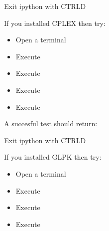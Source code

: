 \documentclass[letterpaper,10pt,english]{sphinxmanual}
\begin{document}
\sphinxAtStartPar
Exit ipython with CTRL\sphinxhyphen{}D

\sphinxAtStartPar
If you installed CPLEX then try:
\begin{itemize}
\item {} 
\sphinxAtStartPar
Open a terminal

\item {} 
\sphinxAtStartPar
Execute 

\item {} 
\sphinxAtStartPar
Execute 

\item {} 
\sphinxAtStartPar
Execute 

\item {} 
\sphinxAtStartPar
Execute 

\end{itemize}

\sphinxAtStartPar
A succesful test should return:

\begin{sphinxVerbatim}[commandchars=\\\{\}]
  
   
     
       
\end{sphinxVerbatim}

\sphinxAtStartPar
Exit ipython with CTRL\sphinxhyphen{}D

\sphinxAtStartPar
If you installed GLPK then try:
\begin{itemize}
\item {} 
\sphinxAtStartPar
Open a terminal

\item {} 
\sphinxAtStartPar
Execute 

\item {} 
\sphinxAtStartPar
Execute 

\item {} 
\sphinxAtStartPar
Execute 

\end{itemize}
\end{document}
